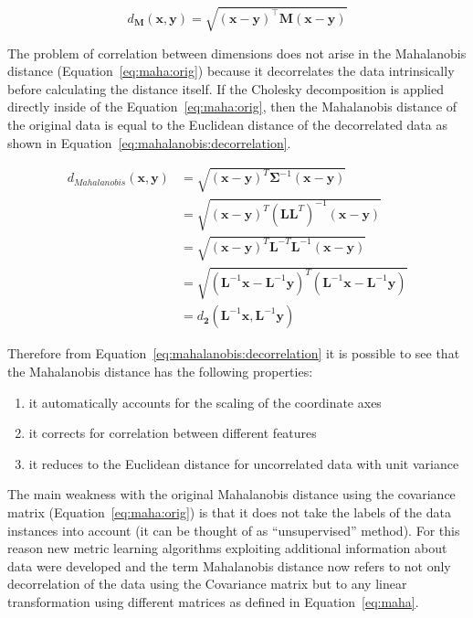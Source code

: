 \documentclass[12pt,a4paper]{report}
\begin{document}
\begin{equation} \label{eq:maha}
d_{\bm{M}}(\textbf{x},\textbf{y}) = \sqrt{(\textbf{x}-\textbf{y})^\top\bm{M}(\textbf{x}-\textbf{y})} 
\end{equation}

The problem of correlation between dimensions does not arise in the Mahalanobis distance (Equation~\ref{eq:maha:orig}) because it decorrelates the data intrinsically before calculating the distance itself. If the Cholesky decomposition is applied directly inside of the Equation~\ref{eq:maha:orig}, then the Mahalanobis distance of the original data is equal to the Euclidean distance of the decorrelated data as shown in Equation~\ref{eq:mahalanobis:decorrelation}.

\begin{align}
  d_{Mahalanobis}(\textbf{x},\textbf{y}) &= \sqrt{(\textbf{x}-\textbf{y})^{T}\bm{\Sigma}^{-1}(\textbf{x}-\textbf{y})} \nonumber\\
         &= \sqrt{(\textbf{x}-\textbf{y})^{T}(\bm{L}\bm{L}^{T})^{-1}(\textbf{x}-\textbf{y})} \nonumber\\
         &= \sqrt{(\textbf{x}-\textbf{y})^{T}\bm{L}^{-T}\bm{L}^{-1}(\textbf{x}-\textbf{y})} \nonumber\\
         &= \sqrt{(\bm{L}^{-1}\textbf{x}-\bm{L}^{-1}\textbf{y})^{T}(\bm{L}^{-1}\textbf{x}-\bm{L}^{-1}\textbf{y})} \nonumber\\
         &= d_{\bm{2}}(\bm{L}^{-1}\textbf{x}, \bm{L}^{-1}\textbf{y}) \label{eq:mahalanobis:decorrelation}
\end{align}

Therefore from Equation~\ref{eq:mahalanobis:decorrelation} it is possible to see that the Mahalanobis distance has the following properties:
\begin{enumerate}
\item it automatically accounts for the scaling of the coordinate axes
\item it corrects for correlation between different features
\item it reduces to the Euclidean distance for uncorrelated data with unit variance
\end{enumerate}

The main weakness with the original Mahalanobis distance using the covariance matrix (Equation~\ref{eq:maha:orig}) is that it does not take the labels of the data instances into account (it can be thought of as ``unsupervised'' method). For this reason new metric learning algorithms exploiting additional information about data were developed and the term Mahalanobis distance now refers to not only decorrelation of the data using the Covariance matrix but to any linear transformation using different matrices as defined in Equation~\ref{eq:maha}.
\end{document}

